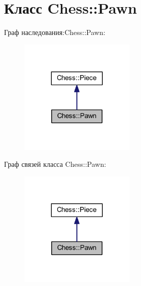 \hypertarget{class_chess_1_1_pawn}{}\section{Класс Chess\+:\+:Pawn}
\label{class_chess_1_1_pawn}


Граф наследования\+:Chess\+:\+:Pawn\+:\nopagebreak
\begin{figure}[H]
\begin{center}
\leavevmode
\includegraphics[width=155pt]{class_chess_1_1_pawn__inherit__graph}
\end{center}
\end{figure}


Граф связей класса Chess\+:\+:Pawn\+:\nopagebreak
\begin{figure}[H]
\begin{center}
\leavevmode
\includegraphics[width=155pt]{class_chess_1_1_pawn__coll__graph}
\end{center}
\end{figure}
